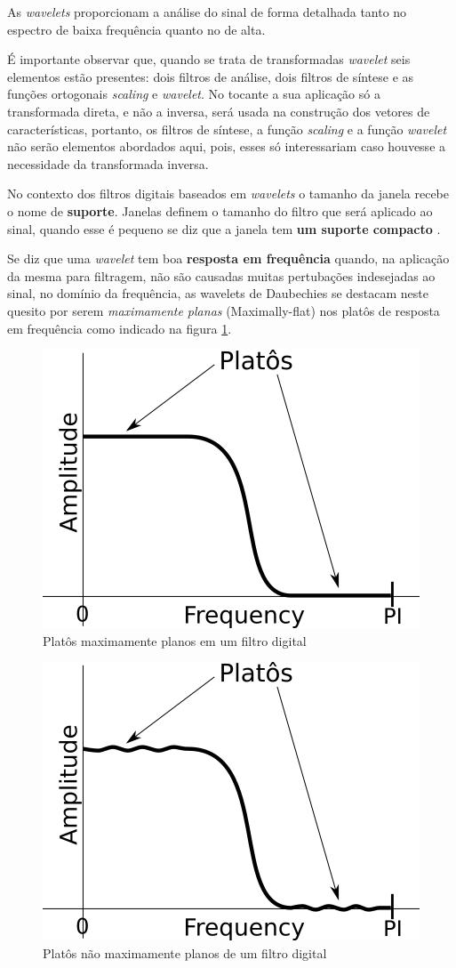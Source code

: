 			\par As \textit{wavelets} proporcionam a análise do sinal de forma detalhada tanto no espectro de baixa frequência quanto no de alta.
			
			\par É importante observar que, quando se trata de transformadas \textit{wavelet} seis elementos estão presentes: dois filtros de análise, dois filtros de síntese e as funções ortogonais \textit{scaling} e \textit{wavelet}. No tocante a sua aplicação só a transformada direta, e não a inversa, será usada na construção dos vetores de características, portanto, os filtros de síntese, a função \textit{scaling} e a função \textit{wavelet} não serão elementos abordados aqui, pois, esses só interessariam caso houvesse a necessidade da transformada inversa.

			\par No contexto dos filtros digitais baseados em \textit{wavelets} o tamanho da janela recebe o nome de \textbf{suporte}. Janelas definem o tamanho do filtro que será aplicado ao sinal, quando esse é pequeno se diz que a janela tem \textbf{um suporte compacto} \cite{robi2003}.
		
			\par Se diz que uma \textit{wavelet} tem boa \textbf{resposta em frequência} quando, na aplicação da mesma para filtragem, não são causadas muitas pertubações indesejadas ao sinal, no domínio da frequência, as wavelets de Daubechies se destacam neste quesito por serem \textit{maximamente planas} (Maximally-flat) nos platôs de resposta em frequência como indicado na figura \ref{fig:daubechies}.

			\begin{figure}[h]
				\centering
				\includegraphics[width=0.3\linewidth]{images/daubechies}
				\caption{Platôs maximamente planos em um filtro digital}
				\label{fig:daubechies}
			\end{figure}

			\begin{figure}[h]
				\centering
				\includegraphics[width=0.3\linewidth]{images/noMaximallyFlat}
				\caption{Platôs não maximamente planos de um filtro digital}
				\label{fig:nomaximallyflat}
			\end{figure}
		
